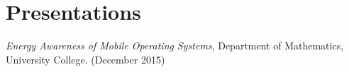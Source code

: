 \section{\sc Presentations}



\emph{Energy Awareness of Mobile Operating Systems}, Department of Mathematics, University College.  (December 2015)

\endinput